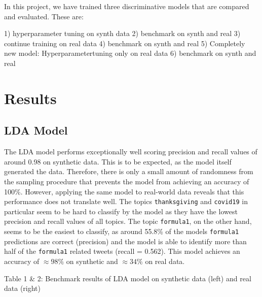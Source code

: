 \documentclass[11pt]{article}
\begin{document}
In this project, we have trained three discriminative models that are compared and evaluated. These are:
1) hyperparameter tuning on synth data
2) benchmark on synth and real
3) continue training on real data
4) benchmark on synth and real
5) Completely new model: Hyperparametertuning only on real data
6) benchmark on synth and real


\section{Results}
\subsection{LDA Model}

The LDA model performs exceptionally well scoring precision and recall values of around 0.98 on synthetic data. This is to be expected, as the model itself generated the data. Therefore, there is only a small amount of randomness from the sampling procedure that prevents the model from achieving an accuracy of 100\%. However, applying the same model to real-world data reveals that this performance does not translate well. The topics \texttt{thanksgiving} and \texttt{covid19} in particular seem to be hard to classify by the model as they have the lowest precision and recall values of all topics. The topic \texttt{formula1}, on the other hand, seems to be the easiest to classify, as around 55.8\% of the models \texttt{formula1} predictions are correct (precision) and the model is able to identify more than half of the \texttt{formula1} related tweets (recall = 0.562). This model achieves an accuracy of $\approx 98\%$ on synthetic and $\approx 34\%$ on real data.
\begin{center}

\qquad

\end{center}
\begin{center}
Table 1 \& 2: Benchmark results of LDA model on synthetic data (left) and real data (right)
\end{center}
\end{document}
